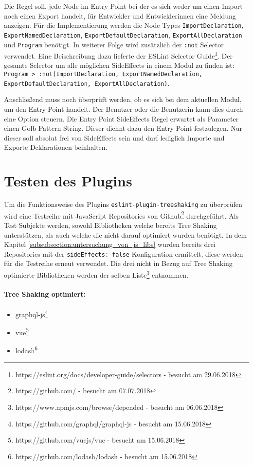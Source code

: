 Die Regel soll, jede Node im Entry Point bei der es sich weder um einen Import noch einen Export handelt, für Entwickler  und Entwicklerinnen eine Meldung anzeigen. Für die Implementierung werden die Node Types \lstinline{ImportDeclaration}, \lstinline{ExportNamedDeclaration}, \lstinline{ExportDefaultDeclaration}, \lstinline{ExportAllDeclaration} und \lstinline{Program} benötigt. In weiterer Folge wird zusätzlich der \lstinline{:not} Selector verwendet. Eine Beischreibung dazu lieferte der ESLint Selector Guide\footnote{https://eslint.org/docs/developer-guide/selectors - besucht am 29.06.2018}. Der gesamte Selector um alle möglichen SideEffects in einem Modul zu finden ist: \lstinline{Program > :not(ImportDeclaration, ExportNamedDeclaration, ExportDefaultDeclaration, ExportAllDeclaration)}.

Anschließend muss noch überprüft werden, ob es sich bei dem aktuellen Modul, um den Entry Point handelt. Der Benutzer oder die Benutzerin kann dies durch eine Option steuern. Die Entry Point SideEffects Regel erwartet als Parameter einen Golb Pattern String. Dieser diehnt dazu den Entry Point festzulegen. Nur dieser soll absolut frei von SideEffects sein und darf lediglich Importe und Exporte Deklarationen beinhalten.

\section{Testen des Plugins}

Um die Funktionsweise des Plugins \lstinline{eslint-plugin-treeshaking} zu überprüfen wird eine Testreihe mit JavaScript Repositories von Github\footnote{https://github.com/ - besucht am 07.07.2018} durchgeführt. Als Test Subjekte werden, sowohl Bibliotheken welche bereits Tree Shaking unterstützen, als auch welche die nicht darauf optimiert wurden benötigt. In dem Kapitel \ref{subsubsection:untersuchung_von_js_libs} wurden bereits drei Repositories mit der \lstinline{sideEffects: false} Konfiguration ermittelt, diese werden für die Testreihe erneut verwendet. Die drei nicht in Bezug auf Tree Shaking optimierte Bibliotheken werden der selben Liste\footnote{https://www.npmjs.com/browse/depended - besucht am 06.06.2018} entnommen. 

\paragraph{Tree Shaking optimiert:}
\begin{itemize}
\item graphql-js\footnote{https://github.com/graphql/graphql-js - besucht am 15.06.2018} 
\item vue\footnote{https://github.com/vuejs/vue - besucht am 15.06.2018} 
\item lodash\footnote{https://github.com/lodash/lodash - besucht am 15.06.2018}
\end{itemize}


